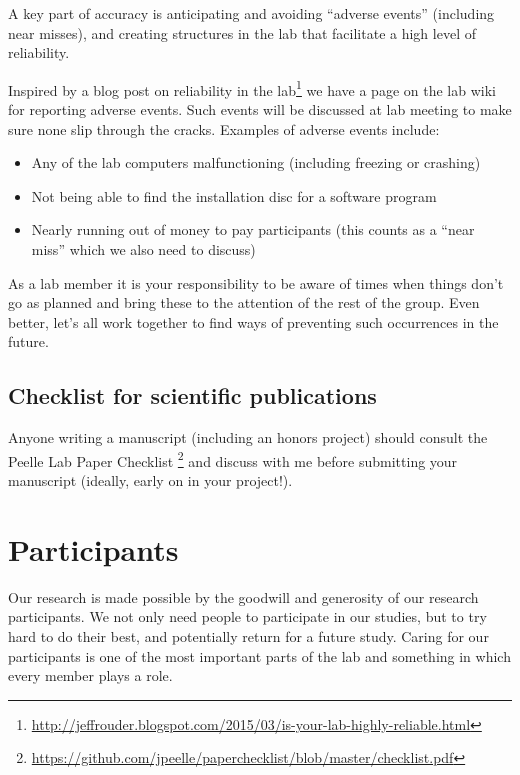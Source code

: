 \documentclass[letterpaper,12pt,oneside]{memoir}
\begin{document}
{A key part of accuracy is anticipating and avoiding ``adverse events'' (including near misses), and creating structures in the lab that facilitate a high level of reliability.

Inspired by a blog post on reliability in the lab\footnote{\url{http://jeffrouder.blogspot.com/2015/03/is-your-lab-highly-reliable.html}} we have a page on the lab wiki for reporting adverse events. Such events will be discussed at lab meeting to make sure none slip through the cracks. Examples of adverse events include:

\begin{itemize}
\item Any of the lab computers malfunctioning (including freezing or crashing)
\item Not being able to find the installation disc for a software program
\item Nearly running out of money to pay participants (this counts as a ``near miss'' which we also need to discuss)
\end{itemize}

As a lab member it is your responsibility to be aware of times when things don't go as planned and bring these to the attention of the rest of the group. Even better, let's all work together to find ways of preventing such occurrences in the future.


\subsection{Checklist for scientific publications}

Anyone writing a manuscript (including an honors project) should consult the Peelle Lab Paper Checklist \footnote{\url{https://github.com/jpeelle/paperchecklist/blob/master/checklist.pdf}} and discuss with me before submitting your manuscript (ideally, early on in your project!).


\section{Participants}
\label{sec:participants}

Our research is made possible by the goodwill and generosity of our research participants. We not only need people to participate in our studies, but to try hard to do their best, and potentially return for a future study. Caring for our participants is one of the most important parts of the lab and something in which every member plays a role.

}
\end{document}
